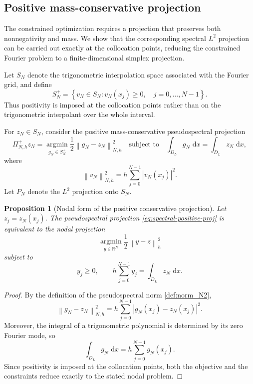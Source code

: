 \documentclass[11pt]{article}
\newcommand{\R}{\mathbb{R}}
\newcommand{\SN}{S_N}
\newcommand{\SNP}{S_N^+}
\newcommand{\PN}{P_N}
\newcommand{\dd}{\,\mathrm{d}}
\newcommand{\norm}[1]{\left\|#1\right\|}
\theoremstyle{plain}
\newtheorem{proposition}[theorem]{Proposition}
\theoremstyle{definition}
\numberwithin{equation}{section}
\begin{document}
\subsection{Positive mass-conservative projection}

The constrained optimization requires a projection that preserves
both nonnegativity and mass. We show that the corresponding spectral
$L^2$ projection can be carried out exactly at the collocation points,
reducing the constrained Fourier problem to a finite-dimensional
simplex projection.

Let $\SN$ denote the trigonometric interpolation space associated with
the Fourier grid, and define
\begin{equation}
\label{eq:SNplus}
\SNP
=
\left\{
v_N\in\SN:
v_N(x_j)\ge0,\quad j=0,\ldots,N-1
\right\}.
\end{equation}
Thus positivity is imposed at the collocation points rather than on
the trigonometric interpolant over the whole interval.

For $z_N\in\SN$, consider the positive mass-conservative
pseudospectral projection
\begin{equation}
\label{eq:spectral-positive-proj}
\Pi_{N,h}^+ z_N
=
\operatorname*{argmin}_{g_N\in\SNP}
\frac12\norm{g_N-z_N}_{N,h}^2
\quad
\text{subject to}
\quad
\int_{D_L}g_N\,\dd x
=
\int_{D_L}z_N\,\dd x ,
\end{equation}
where
\begin{equation} \label{def:norm_N2}
\norm{v_N}_{N,h}^2
=
h\sum_{j=0}^{N-1}|v_N(x_j)|^2.
\end{equation}
Let $\PN$ denote the $L^2$ projection onto $\SN$.

\begin{proposition}[Nodal form of the positive conservative projection]
\label{prop:proj-equiv}
Let $z_j=z_N(x_j)$. The pseudospectral projection
\eqref{eq:spectral-positive-proj} is equivalent to the nodal
projection
\[
\operatorname*{argmin}_{y\in\R^N}
\frac12\norm{y-z}_h^2
\]
subject to
\[
y_j\ge0,
\qquad
h\sum_{j=0}^{N-1}y_j
=
\int_{D_L}z_N\,\dd x .
\]
\end{proposition}

\begin{proof}
By the definition of the pseudospectral norm \eqref{def:norm_N2},
\[
\norm{g_N-z_N}_{N,h}^2
=
h\sum_{j=0}^{N-1}
|g_N(x_j)-z_N(x_j)|^2.
\]
Moreover, the integral of a trigonometric polynomial is determined by
its zero Fourier mode, so
\[
\int_{D_L}g_N\,\dd x
=
h\sum_{j=0}^{N-1}g_N(x_j).
\]
Since positivity is imposed at the collocation points, both the
objective and the constraints reduce exactly to the stated nodal
problem.
\end{proof}
\end{document}
